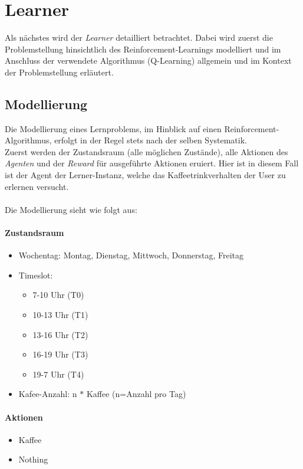 \newpage
\section{Learner}
\label{sec:ql}
Als nächstes wird der \textit{Learner} detailliert betrachtet. Dabei wird zuerst die Problemstellung hinsichtlich des Reinforcement-Learnings modelliert und im Anschluss der verwendete Algorithmus (Q-Learning) allgemein und im Kontext der Problemstellung erläutert.

\subsection{Modellierung}
\label{subsec:modulation}
Die Modellierung eines Lernproblems, im Hinblick auf einen Reinforcement-Algorithmus, erfolgt in der Regel stets nach der selben Systematik. \\
Zuerst werden der Zustandsraum (alle möglichen Zustände), alle Aktionen des \textit{Agenten} und der \textit{Reward} für ausgeführte Aktionen eruiert.
Hier ist in diesem Fall ist der Agent der Lerner-Instanz, welche das Kaffeetrinkverhalten der User zu erlernen versucht.\\\\
Die Modellierung sieht wie folgt aus: 
\paragraph{Zustandsraum}
\begin{itemize}
	\item Wochentag: Montag, Dienstag, Mittwoch, Donnerstag, Freitag
	\item Timeslot:
	      \begin{itemize}
	      	\item 7-10 Uhr (T0)
	      	\item 10-13 Uhr (T1)
	      	\item 13-16 Uhr (T2)
	      	\item 16-19 Uhr (T3)
	      	\item 19-7 Uhr (T4)
	      \end{itemize} 
	\item Kafee-Anzahl: n $*$ Kaffee (n=Anzahl pro Tag)
\end{itemize}

\paragraph{Aktionen}
\begin{itemize}
	\item Kaffee
	\item Nothing
\end{itemize}


